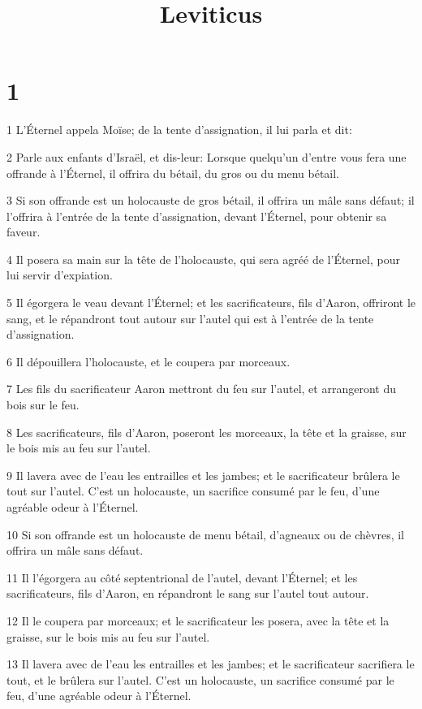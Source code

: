 

\title{Leviticus}


\chapter{1}

\par 1 L'Éternel appela Moïse; de la tente d'assignation, il lui parla et dit:
\par 2 Parle aux enfants d'Israël, et dis-leur: Lorsque quelqu'un d'entre vous fera une offrande à l'Éternel, il offrira du bétail, du gros ou du menu bétail.
\par 3 Si son offrande est un holocauste de gros bétail, il offrira un mâle sans défaut; il l'offrira à l'entrée de la tente d'assignation, devant l'Éternel, pour obtenir sa faveur.
\par 4 Il posera sa main sur la tête de l'holocauste, qui sera agréé de l'Éternel, pour lui servir d'expiation.
\par 5 Il égorgera le veau devant l'Éternel; et les sacrificateurs, fils d'Aaron, offriront le sang, et le répandront tout autour sur l'autel qui est à l'entrée de la tente d'assignation.
\par 6 Il dépouillera l'holocauste, et le coupera par morceaux.
\par 7 Les fils du sacrificateur Aaron mettront du feu sur l'autel, et arrangeront du bois sur le feu.
\par 8 Les sacrificateurs, fils d'Aaron, poseront les morceaux, la tête et la graisse, sur le bois mis au feu sur l'autel.
\par 9 Il lavera avec de l'eau les entrailles et les jambes; et le sacrificateur brûlera le tout sur l'autel. C'est un holocauste, un sacrifice consumé par le feu, d'une agréable odeur à l'Éternel.
\par 10 Si son offrande est un holocauste de menu bétail, d'agneaux ou de chèvres, il offrira un mâle sans défaut.
\par 11 Il l'égorgera au côté septentrional de l'autel, devant l'Éternel; et les sacrificateurs, fils d'Aaron, en répandront le sang sur l'autel tout autour.
\par 12 Il le coupera par morceaux; et le sacrificateur les posera, avec la tête et la graisse, sur le bois mis au feu sur l'autel.
\par 13 Il lavera avec de l'eau les entrailles et les jambes; et le sacrificateur sacrifiera le tout, et le brûlera sur l'autel. C'est un holocauste, un sacrifice consumé par le feu, d'une agréable odeur à l'Éternel.
